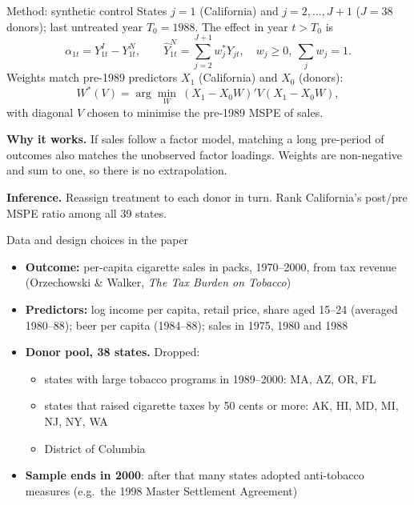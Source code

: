 \documentclass[10pt,aspectratio=169]{beamer}
\begin{document}
\begin{frame}{Method: synthetic control}
States $j = 1$ (California) and $j = 2,\dots,J+1$ ($J = 38$ donors); last
untreated year $T_0 = 1988$. The effect in year $t > T_0$ is
\[
  \alpha_{1t} = Y_{1t}^{I} - Y_{1t}^{N}, \qquad
  \hat Y_{1t}^{N} = \sum_{j=2}^{J+1} w_j^{*} Y_{jt}, \quad
  w_j \ge 0,\ \sum_j w_j = 1 .
\]
Weights match pre-1989 predictors $X_1$ (California) and $X_0$ (donors):
\[
  W^{*}(V) = \arg\min_{W}\ (X_1 - X_0 W)' V (X_1 - X_0 W),
\]
with diagonal $V$ chosen to minimise the pre-1989 MSPE of sales.

\medskip
\textbf{Why it works.} If sales follow a factor model, matching a long
pre-period of outcomes also matches the unobserved factor loadings. Weights
are non-negative and sum to one, so there is no extrapolation.

\medskip
\textbf{Inference.} Reassign treatment to each donor in turn. Rank
California's post/pre MSPE ratio among all 39 states.
\end{frame}

\begin{frame}{Data and design choices in the paper}
\begin{itemize}
\item \textbf{Outcome:} per-capita cigarette sales in packs, 1970--2000,
from tax revenue (Orzechowski \& Walker, \emph{The Tax Burden on Tobacco})
\item \textbf{Predictors:} log income per capita, retail price, share aged
15--24 (averaged 1980--88); beer per capita (1984--88); sales in 1975, 1980
and 1988
\item \textbf{Donor pool, 38 states.} Dropped:
  \begin{itemize}
  \item states with large tobacco programs in 1989--2000: MA, AZ, OR, FL
  \item states that raised cigarette taxes by 50 cents or more: AK, HI, MD,
  MI, NJ, NY, WA
  \item District of Columbia
  \end{itemize}
\item \textbf{Sample ends in 2000}: after that many states adopted
anti-tobacco measures (e.g.\ the 1998 Master Settlement Agreement)
\end{itemize}
\end{frame}
\end{document}
